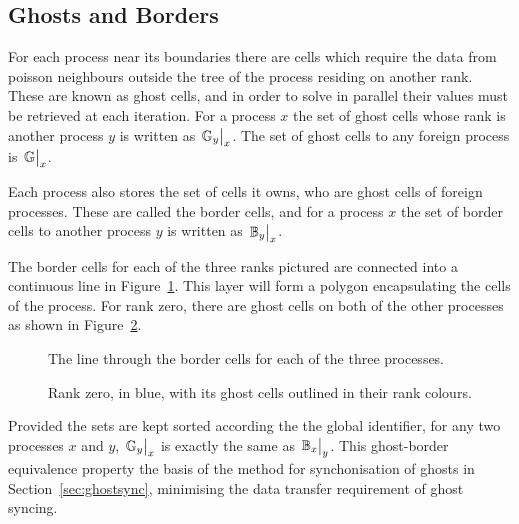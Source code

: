 \documentclass[twoside]{IIBproject}
\numberwithin{figure}{section}
\begin{document}


    \subsection{Ghosts and Borders} %
        \label{sec:ghostsandborders}

        For each process near its boundaries there are cells which require the data from poisson neighbours outside the tree of the process residing on another rank. These are known as ghost cells, and in order to solve in parallel their values must be retrieved at each iteration. For a process $x$ the set of ghost cells whose rank is another process $y$ is written as $\eval{\mathbb{G}_y}_x$. The set of ghost cells to any foreign process is $\eval{\mathbb{G}}_x$.

        Each process also stores the set of cells it owns, who are ghost cells of foreign processes. These are called the border cells, and for a process $x$ the set of border cells to another process $y$ is written as $\eval{\mathbb{B}_y}_x$.

        The border cells for each of the three ranks pictured are connected into a continuous line in Figure~\ref{fig:borderline}. This layer will form a polygon encapsulating the cells of the process. For rank zero, there are ghost cells on both of the other processes as shown in Figure~\ref{fig:borders-r0}. 

        \begin{figure}[!htbp]
            
            \caption{The line through the border cells for each of the three processes. }
            \label{fig:borderline}
        \end{figure}

        \begin{figure}[!htbp]
            
            \caption{Rank zero, in blue, with its ghost cells outlined in their rank colours.}
            \label{fig:borders-r0}
        \end{figure}

        Provided the sets are kept sorted according the the global identifier, for any two processes $x$ and $y$, $\eval{\mathbb{G}_y}_x$ is exactly the same as $\eval{\mathbb{B}_x}_y$. This ghost-border equivalence property the basis of the method for synchonisation of ghosts in Section~\ref{sec:ghostsync}, minimising the data transfer requirement of ghost syncing. 
\end{document}
